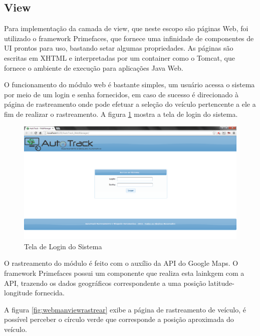 \subsection{View}

Para implementação da camada de view, que neste escopo são páginas Web, foi utilizado o framework Primefaces, que fornece uma infinidade de componentes de UI prontos para uso, bastando setar algumas propriedades. As páginas são escritas em XHTML e interpretadas por um container como o Tomcat, que fornece o ambiente de execução para aplicações Java Web.

O funcionamento do módulo web é bastante simples, um usuário acessa o sistema por meio de um login e senha fornecidos, em caso de sucesso é direcionado à página de rastreamento onde pode efetuar a seleção do veículo pertencente a ele a fim de realizar o rastreamento. A figura \ref{fig:webmanviewlogin} mostra a tela de login do sistema.

\begin{figure}[!htb]
	\centering
	\includegraphics[width=15.00cm\textwidth]{figures/webmanager_login.png}
	\caption{Tela de Login do Sistema}
	\label{fig:webmanviewlogin}
\end{figure}

O rastreamento do módulo é feito com o auxílio da API do Google Maps. O framework Primefaces possui um componente que realiza esta lainkgem com a API, trazendo os dados geográficos correspondente a uma posição latitude-longitude fornecida.

A figura \ref{fig:webmanviewrastrear} exibe a página de rastreamento de veículo, é possível perceber o círculo verde que corresponde a posição aproximada do veículo.

